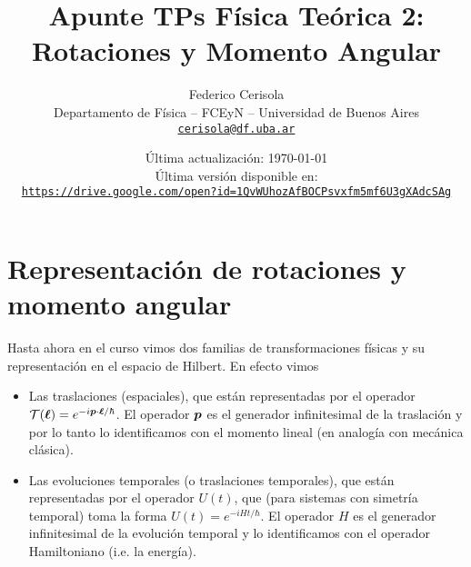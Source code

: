 \documentclass[10pt, a4paper]{article}
\numberwithin{equation}{subsection}
\begin{document}
\title{Apunte TPs Física Teórica 2: Rotaciones y Momento Angular}
\author{Federico Cerisola
  \\ \small{Departamento de Física -- FCEyN -- Universidad de Buenos Aires}
  \\ \small{\href{mailto:cerisola@df.uba.ar}{\nolinkurl{cerisola@df.uba.ar}}}
}
\date{\small Última actualización: \today \\[1em]
  Última versión disponible en: \\
  \texttt{
    \href{https://drive.google.com/open?id=1QvWUhozAfBOCPsvxfm5mf6U3gXAdcSAg}
    {https://drive.google.com/open?id=1QvWUhozAfBOCPsvxfm5mf6U3gXAdcSAg}
  }}
\maketitle
\thispagestyle{empty}

\vfill
\doclicenseThis

\pagebreak

\newpage
  \tableofcontents
\newpage

\section{Representación de rotaciones y momento angular}

Hasta ahora en el curso vimos dos familias de transformaciones físicas y su
representación en el espacio de Hilbert. En efecto vimos
\begin{itemize}
  \item Las traslaciones (espaciales), que están representadas por el operador
    $\TranslationOp(\vect{\ell}) = e^{-i\vect{p}\cdot\vect{\ell}/\hbar}$. El
    operador $\vb*{p}$ es el generador infinitesimal de la traslación y por lo
    tanto lo identificamos con el momento lineal (en analogía con mecánica
    clásica).
  \item Las evoluciones temporales (o traslaciones temporales), que están
    representadas por el operador $U(t)$, que (para sistemas con simetría
    temporal) toma la forma $U(t) = e^{-iHt/\hbar}$. El operador $H$ es el
    generador infinitesimal de la evolución temporal y lo identificamos con el
    operador Hamiltoniano (i.e. la energía).
\end{itemize}
\end{document}
